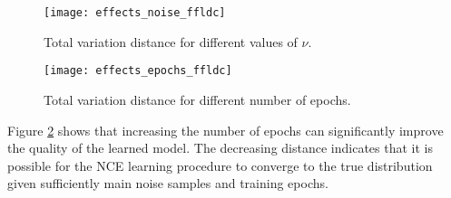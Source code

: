 \begin{figure}
  \centering
  \texttt{[image: effects\_noise\_ffldc]}
  \caption{Total variation distance for different values of $\nu$.}
  \label{fig:effects_noise_ffldc}
\end{figure}

\begin{figure}
  \centering
  \texttt{[image: effects\_epochs\_ffldc]}
  \caption{Total variation distance for different number of epochs.}
  \label{fig:effects_epochs_ffld}
\end{figure}

Figure \ref{fig:effects_epochs_ffld} shows that increasing the number of epochs can significantly improve the quality of the learned model. The decreasing distance indicates that it is possible for the NCE learning procedure to converge to the true distribution given sufficiently main noise samples and training epochs.